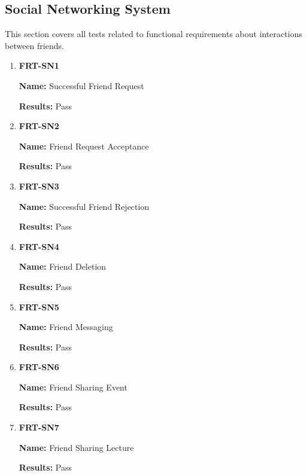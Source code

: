 \documentclass[12pt, titlepage]{article}
\begin{document}
\subsection{Social Networking System}
This section covers all tests related to functional requirements about interactions between friends.
\begin{enumerate}
\item \textbf{FRT-SN1}

\textbf{Name:} Successful Friend Request

\textbf{Results:} Pass

\item \textbf{FRT-SN2}

\textbf{Name:} Friend Request Acceptance

\textbf{Results:} Pass

\item \textbf{FRT-SN3}

\textbf{Name:} Successful Friend Rejection

\textbf{Results:} Pass

\item \textbf{FRT-SN4}

\textbf{Name:} Friend Deletion

\textbf{Results:} Pass

\item \textbf{FRT-SN5}

\textbf{Name:} Friend Messaging

\textbf{Results:} Pass

\item \textbf{FRT-SN6}

\textbf{Name:} Friend Sharing Event

\textbf{Results:} Pass

\item \textbf{FRT-SN7}

\textbf{Name:} Friend Sharing Lecture

\textbf{Results:} Pass
\end{enumerate}
\end{document}
